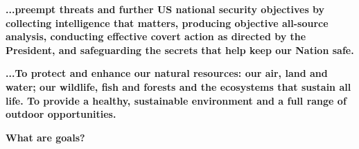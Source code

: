 \documentclass[aspectratio=169]{beamer}
\theoremstyle{principle}
\begin{document}
\begin{frame}

\begin{center}
\huge\textbf{...preempt threats and further US national security objectives by collecting intelligence that matters, producing objective all-source analysis, conducting effective covert action as directed by the President, and safeguarding the secrets that help keep our Nation safe.}
\end{center}

\end{frame}

\begin{frame}

\begin{center}
\huge\textbf{...To protect and enhance our natural resources: our air, land and water; our wildlife, fish and forests and the ecosystems that sustain all life. To provide a healthy, sustainable environment and a full range of outdoor opportunities.}
\end{center}

\end{frame}

\begin{frame}

\begin{center}
\huge\textbf{What are goals?}
\end{center}

\end{frame}
\end{document}
